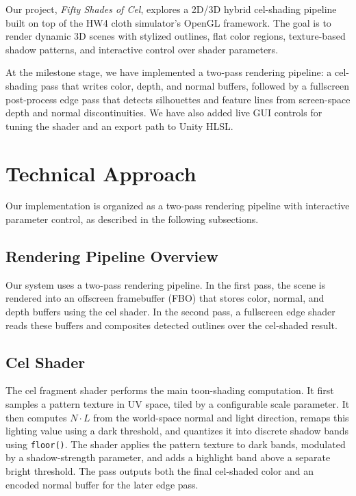 \documentclass[acmtog,screen]{acmart}
\begin{document}
Our project, \textit{Fifty Shades of Cel}, explores a 2D/3D hybrid cel-shading pipeline built on top of the HW4 cloth simulator's OpenGL framework. The goal is to render dynamic 3D scenes with stylized outlines, flat color regions, texture-based shadow patterns, and interactive control over shader parameters.

At the milestone stage, we have implemented a two-pass rendering pipeline: a cel-shading pass that writes color, depth, and normal buffers, followed by a fullscreen post-process edge pass that detects silhouettes and feature lines from screen-space depth and normal discontinuities. We have also added live GUI controls for tuning the shader and an export path to Unity HLSL.

\section{Technical Approach}

Our implementation is organized as a two-pass rendering pipeline with interactive parameter control, as described in the following subsections.

\subsection{Rendering Pipeline Overview}

Our system uses a two-pass rendering pipeline. In the first pass, the scene is rendered into an offscreen framebuffer (FBO) that stores color, normal, and depth buffers using the cel shader. In the second pass, a fullscreen edge shader reads these buffers and composites detected outlines over the cel-shaded result.

\subsection{Cel Shader}

The cel fragment shader performs the main toon-shading computation. It first samples a pattern texture in UV space, tiled by a configurable scale parameter. It then computes $N \cdot L$ from the world-space normal and light direction, remaps this lighting value using a dark threshold, and quantizes it into discrete shadow bands using \texttt{floor()}. The shader applies the pattern texture to dark bands, modulated by a shadow-strength parameter, and adds a highlight band above a separate bright threshold. The pass outputs both the final cel-shaded color and an encoded normal buffer for the later edge pass.
\end{document}
